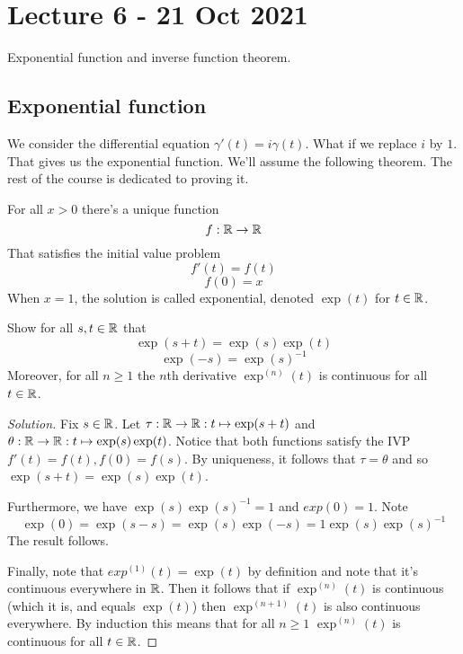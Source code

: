 \section{Lecture 6 - 21 Oct 2021}
Exponential function and inverse function theorem.
\subsection{Exponential function}
We consider the differential equation $\gamma'(t)=i\gamma(t)$. What if we replace $i$ by
$1$. That gives us the exponential function. We'll assume the following theorem. The rest
of the course is dedicated to proving it.
\begin{theorem}
  For all $x>0$ there's a unique function 
  \[f:\mathbb R\to\mathbb R\]
  That satisfies the initial value problem
  \[f'(t)=f(t)\]
  \[f(0)=x\]
  When $x=1$, the solution is called exponential, denoted $\exp(t)$ for $t\in\mathbb R$.
  \label{thm:expFunc}
\end{theorem}

\begin{exercise}
  Show for all $s,t\in\mathbb R$ that
  \[\exp(s+t)=\exp(s)\exp(t)\]
  \[\exp(-s)=\exp(s)^{-1}\]
  Moreover, for all $n\geq 1$ the $n$th derivative $\exp^{(n)}(t)$ is continuous for all 
  $t\in\mathbb R$.
\end{exercise}
\begin{proof}[Solution]
  Fix $s\in\mathbb R$. Let $\tau:\mathbb R\to\mathbb R:t\mapsto \exp(s+t)$ and $\theta:\mathbb R\to\mathbb R:t\mapsto
  \exp(s)\exp(t)$. Notice that both functions satisfy the IVP $f'(t)=f(t), f(0)=f(s)$. By
  uniqueness, it follows that $\tau=\theta$ and so $\exp(s+t)=\exp(s)\exp(t)$.

  Furthermore, we have $\exp(s)\exp(s)^{-1}=1$ and $exp(0)=1$. Note 
  \[\exp(0)=\exp(s-s)=\exp(s)\exp(-s)=1\exp(s)\exp(s)^{-1}\]
  The result follows.

  Finally, note that $exp^{(1)}(t)=\exp(t)$ by definition and note that it's continuous
  everywhere in $\mathbb R$. Then it follows that if $\exp^{(n)}(t)$ is continuous (which it is,
  and equals $\exp(t)$) then $\exp^{(n+1)}(t)$ is also continuous everywhere. By
  induction this means that for all $n\geq 1$ $\exp^{(n)}(t)$ is continuous for all
  $t\in\mathbb R$.
\end{proof}


